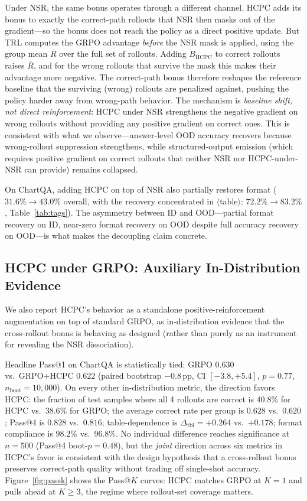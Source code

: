 \documentclass[11pt]{article}
\begin{document}
Under NSR, the same bonus operates through a different channel.
HCPC adds its bonus to exactly the correct-path rollouts that NSR
then masks out of the gradient---so the bonus does not reach the
policy as a direct positive update. But TRL computes the GRPO
advantage \emph{before} the NSR mask is applied, using the group
mean $\bar R$ over the full set of rollouts. Adding $B_{\text{HCPC}}$
to correct rollouts raises $\bar R$, and for the wrong rollouts that
survive the mask this makes their advantage more negative. The
correct-path bonus therefore reshapes the reference baseline that
the surviving (wrong) rollouts are penalized against, pushing the
policy harder away from wrong-path behavior. The mechanism is
\emph{baseline shift, not direct reinforcement}: HCPC under NSR
strengthens the negative gradient on wrong rollouts without
providing any positive gradient on correct ones. This is consistent
with what we observe---answer-level OOD accuracy recovers because
wrong-rollout suppression strengthens, while structured-output
emission (which requires positive gradient on correct rollouts that
neither NSR nor HCPC-under-NSR can provide) remains collapsed.

On ChartQA, adding HCPC on top of NSR also partially restores format
($31.6\%\!\to\!43.0\%$ overall, with the recovery concentrated in
$\langle$table$\rangle$: $72.2\%\!\to\!83.2\%$, Table~\ref{tab:tags}).
The asymmetry between ID and OOD---partial format recovery on ID,
near-zero format recovery on OOD despite full accuracy recovery on
OOD---is what makes the decoupling claim concrete.

\subsection{HCPC under GRPO: Auxiliary In-Distribution Evidence}
\label{sec:hcpc_grpo}

We also report HCPC's behavior as a standalone positive-reinforcement
augmentation on top of standard GRPO, as in-distribution evidence
that the cross-rollout bonus is behaving as designed (rather than
purely as an instrument for revealing the NSR dissociation).

Headline Pass@1 on ChartQA is statistically tied: \textsc{GRPO}
$0.630$ vs.\ \textsc{GRPO+HCPC} $0.622$ (paired bootstrap
$-0.8$\,pp, CI $[-3.8,+5.4]$, $p{=}0.77$, $n_{\text{boot}}{=}10{,}000$).
On every other in-distribution metric, the direction favors HCPC:
the fraction of test samples where all 4 rollouts are correct is
$40.8\%$ for HCPC vs.\ $38.6\%$ for GRPO; the average correct rate
per group is $0.628$ vs.\ $0.620$; Pass@4 is $0.828$ vs.\ $0.816$;
table-dependence is $\Delta_{\text{tbl}}{=}{+}0.264$ vs.\ $+0.178$;
format compliance is $98.2\%$ vs.\ $96.8\%$. No individual difference
reaches significance at $n{=}500$ (Pass@4 boot-$p{=}0.48$), but the
\emph{joint} direction across six metrics in HCPC's favor is
consistent with the design hypothesis that a cross-rollout bonus
preserves correct-path quality without trading off single-shot
accuracy. Figure~\ref{fig:passk} shows the Pass@$K$ curves: HCPC
matches GRPO at $K{=}1$ and pulls ahead at $K{\geq}3$, the regime
where rollout-set coverage matters.
\end{document}
